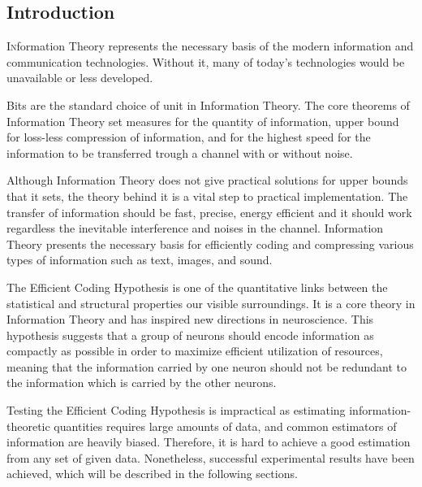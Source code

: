 \documentclass[twoside]{article}
\begin{document}
\begin{multicols}{2} %

\section{Introduction}

\lettrine[nindent=0em,lines=3]{I}nformation Theory represents the necessary basis of the modern information and communication technologies. Without it, many of today's technologies would be unavailable or less developed.

Bits are the standard choice of unit in Information Theory. The core theorems of Information Theory set measures for the quantity of information, upper bound for loss-less compression of information, and for the highest speed for the information to be transferred trough a channel with or without noise. 

Although Information Theory does not give practical solutions for upper bounds that it sets, the theory behind it is a vital step to practical implementation. The transfer of information should be fast, precise, energy efficient and it should work regardless the inevitable interference and noises in the channel. Information Theory presents the necessary basis for efficiently coding and compressing various types of information such as text, images, and sound. 

The Efficient Coding Hypothesis is one of the quantitative links between the statistical and structural properties our visible surroundings. It is a core theory in Information Theory and has inspired new directions in neuroscience. This hypothesis suggests that a group of neurons should encode information as compactly as possible in order to maximize efficient utilization of resources, meaning that the information carried by one neuron should not be redundant to the information which is carried by the other neurons. 

Testing the Efficient Coding Hypothesis is impractical as estimating information-theoretic quantities requires large amounts of data, and common estimators of information are heavily biased. Therefore, it is hard to achieve a good estimation from any set of given data. Nonetheless, successful experimental results have been achieved, which will be described in the following sections.





\end{multicols}
\end{document}
